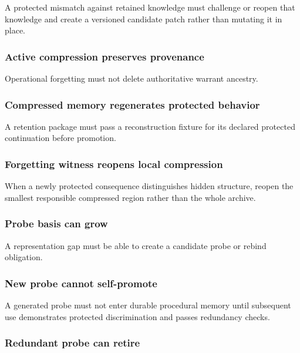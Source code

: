 \documentclass[
]{article}
\begin{document}
A protected mismatch against retained knowledge must challenge or reopen that
knowledge and create a versioned candidate patch rather than mutating it in
place.

\subsubsection{Active compression preserves provenance}\label{active-compression-preserves-provenance-test}

Operational forgetting must not delete authoritative warrant ancestry.

\subsubsection{Compressed memory regenerates protected behavior}\label{compressed-memory-regenerates-protected-behavior-test}

A retention package must pass a reconstruction fixture for its declared
protected continuation before promotion.

\subsubsection{Forgetting witness reopens local compression}\label{forgetting-witness-reopens-local-compression-test}

When a newly protected consequence distinguishes hidden structure, reopen the
smallest responsible compressed region rather than the whole archive.

\subsubsection{Probe basis can grow}\label{probe-basis-can-grow-test}

A representation gap must be able to create a candidate probe or rebind
obligation.

\subsubsection{New probe cannot self-promote}\label{new-probe-cannot-self-promote-test}

A generated probe must not enter durable procedural memory until subsequent use
demonstrates protected discrimination and passes redundancy checks.

\subsubsection{Redundant probe can retire}\label{redundant-probe-can-retire-test}
\end{document}
